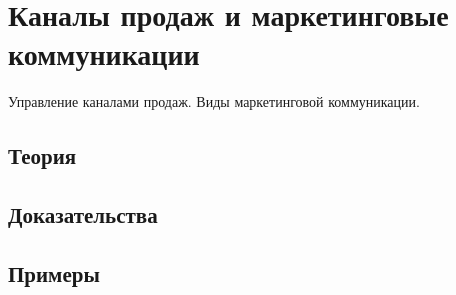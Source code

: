 
\section{Каналы продаж и маркетинговые коммуникации}
\label{sec:2.6.03-sales-channels}

\begin{ticket}
Управление каналами продаж. Виды маркетинговой коммуникации.
\end{ticket}

\subsection*{Теория}

\subsection*{Доказательства}

\subsection*{Примеры}

